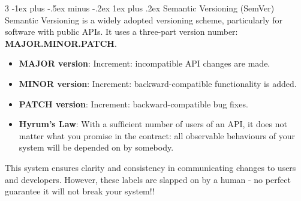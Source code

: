 \documentclass[a4paper, 10pt, landscape]{article}
\makeatletter
\renewcommand{\subsubsection}{\@startsection{subsubsection}{3}{0mm}%
                                {-1ex plus -.5ex minus -.2ex}%
                                {1ex plus .2ex}%
                                {\normalfont\small\bfseries}}
\makeatother
\begin{document}
\begin{multicols*}{3}
\subsubsection{Semantic Versioning (SemVer)}
Semantic Versioning is a widely adopted versioning scheme, particularly for software with public APIs. It uses a three-part version number: \textbf{MAJOR.MINOR.PATCH}.
\begin{itemize}[itemsep=-1pt]
    \item \textbf{MAJOR version}: Increment: incompatible API changes are made.
    \item \textbf{MINOR version}: Increment: backward-compatible functionality is added.
    \item \textbf{PATCH version}: Increment: backward-compatible bug fixes.
    \item \textbf{Hyrum's Law}: With a sufficient number of users of an API, it does not matter what you promise in the contract: all observable behaviours of your system will be depended on by somebody. 
\end{itemize}
This system ensures clarity and consistency in communicating changes to users and developers.  However, these labels are slapped on by a human - no perfect guarantee it will not break your system!!


\end{multicols*}
\end{document}
